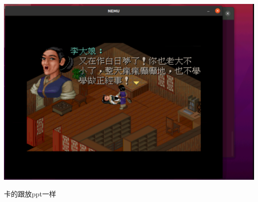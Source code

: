 \documentclass[UTF8,a4paper,10pt]{ctexart}
\begin{document}
\begin{center}
  \includegraphics*[scale = 0.4]{pic/12}
\end{center}

卡的跟放ppt一样
\end{document}
